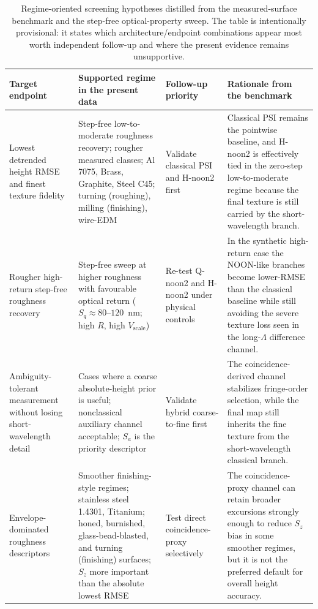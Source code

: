 \begin{table}[t]
\centering
\footnotesize
\setlength{\tabcolsep}{4pt}
\renewcommand{\arraystretch}{1.08}
\caption{Regime-oriented screening hypotheses distilled from the measured-surface benchmark and the step-free optical-property sweep. The table is intentionally provisional: it states which architecture/endpoint combinations appear most worth independent follow-up and where the present evidence remains unsupportive.}
\label{tab:regime_summary}
\begin{tabularx}{\textwidth}{>{\RaggedRight\arraybackslash}p{2.6cm}>{\RaggedRight\arraybackslash}p{4.0cm}>{\RaggedRight\arraybackslash}p{2.5cm}>{\RaggedRight\arraybackslash}X}
\toprule
Target endpoint & Supported regime in the present data & Follow-up priority & Rationale from the benchmark \\
\midrule
Lowest detrended height RMSE and finest texture fidelity & Step-free low-to-moderate roughness recovery; rougher measured classes; Al 7075, Brass, Graphite, Steel C45; turning (roughing), milling (finishing), wire-EDM & Validate classical PSI and H-noon2 first & Classical PSI remains the pointwise baseline, and H-noon2 is effectively tied in the zero-step low-to-moderate regime because the final texture is still carried by the short-wavelength branch. \\

Rougher high-return step-free roughness recovery & Step-free sweep at higher roughness with favourable optical return ($S_q\approx 80$--$120$~nm; high $R$, high $V_\mathrm{scale}$) & Re-test Q-noon2 and H-noon2 under physical controls & In the synthetic high-return case the NOON-like branches become lower-RMSE than the classical baseline while still avoiding the severe texture loss seen in the long-$\Lambda$ difference channel. \\

Ambiguity-tolerant measurement without losing short-wavelength detail & Cases where a coarse absolute-height prior is useful; nonclassical auxiliary channel acceptable; $S_a$ is the priority descriptor & Validate hybrid coarse-to-fine first & The coincidence-derived channel stabilizes fringe-order selection, while the final map still inherits the fine texture from the short-wavelength classical branch. \\

Envelope-dominated roughness descriptors & Smoother finishing-style regimes; stainless steel 1.4301, Titanium; honed, burnished, glass-bead-blasted, and turning (finishing) surfaces; $S_z$ more important than the absolute lowest RMSE & Test direct coincidence-proxy selectively & The coincidence-proxy channel can retain broader excursions strongly enough to reduce $S_z$ bias in some smoother regimes, but it is not the preferred default for overall height accuracy. \\


\end{tabularx}
\end{table}
